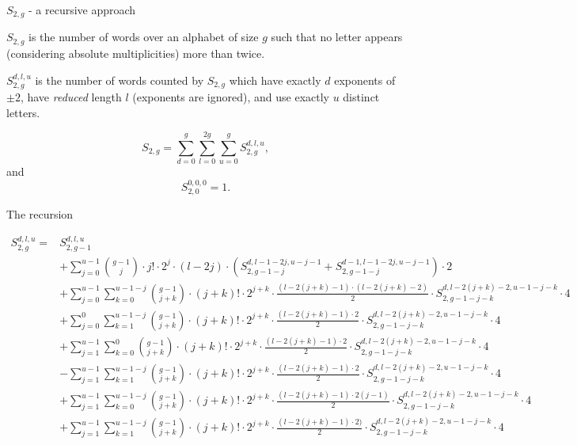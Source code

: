 \begin{frame}{$S_{2,g}$ - a recursive approach}

  \begin{definition}
    $S_{2,g}$ is the number of words over an alphabet of size $g$ such
    that no letter appears (considering absolute multiplicities) more
    than twice.
  \end{definition}

  \pause

  \begin{definition}
    $S_{2,g}^{d,l,u}$ is the number of words counted by $S_{2,g}$ which
    have exactly $d$ exponents of $\pm 2$, have \emph{reduced} length
    $l$ (exponents are ignored), and use exactly $u$ distinct letters.
  \end{definition}

  \pause

  \[S_{2,g} = \sum_{d=0}^{g} \sum_{l=0}^{2g} \sum_{u=0}^{g}
    S_{2,g}^{d,l,u}, \]
  and
  \[ S_{2,0}^{0,0,0} = 1. \]


\end{frame}

\begin{frame}{The recursion}

  {\tiny
    \begin{align*}
      S_{2,g}^{d,l,u} =& S_{2,g-1}^{d,l,u} \\
                       &+\sum_{j=0}^{u-1} {g-1 \choose j} \cdot j! \cdot 2^j \cdot (l - 2j) \cdot \left( S_{2,g-1-j}^{d, l-1-2j, u-j-1} + S_{2,g-1-j}^{d-1,l-1-2j,u-j-1} \right) \cdot 2 \\
                       &+  \sum_{j=0}^{u-1} \sum_{k=0}^{u-1-j} { g-1 \choose j + k} \cdot (j + k)! \cdot 2^{j + k} \cdot \frac{(l - 2(j + k) - 1) \cdot (l - 2 (j + k) - 2)}{2} \cdot S_{2,g-1-j-k}^{d,l-2(j+k) - 2,u-1-j-k} \cdot 4 \\
                       &+ \sum_{j=0}^{0} \sum_{k=1}^{u-1-j} { g-1 \choose j + k} \cdot (j + k)! \cdot 2^{j + k} \cdot \frac{(l - 2(j + k) - 1) \cdot 2}{2} \cdot S_{2,g-1-j-k}^{d,l-2(j+k) - 2,u-1-j-k} \cdot 4 \\
                       &+ \sum_{j=1}^{u-1} \sum_{k=0}^{0} { g-1 \choose j + k} \cdot (j + k)! \cdot 2^{j + k} \cdot \frac{(l - 2(j + k) - 1) \cdot 2}{2} \cdot S_{2,g-1-j-k}^{d,l-2(j+k) - 2,u-1-j-k} \cdot 4 \\
                       &- \sum_{j=1}^{u-1} \sum_{k=1}^{u-1-j} { g-1 \choose j + k} \cdot (j + k)! \cdot 2^{j + k} \cdot \frac{(l - 2(j + k) - 1) \cdot 2}{2} \cdot S_{2,g-1-j-k}^{d,l-2(j+k) - 2,u-1-j-k} \cdot 4 \\
                       &+ \sum_{j=1}^{u-1} \sum_{k=0}^{u-1-j} { g-1 \choose j + k} \cdot (j + k)! \cdot 2^{j + k} \cdot \frac{(l - 2(j + k) - 1) \cdot 2(j-1)}{2} \cdot S_{2,g-1-j-k}^{d,l-2(j+k) - 2,u-1-j-k} \cdot 4\\
                       &+ \sum_{j=1}^{u-1} \sum_{k=1}^{u-1-j} { g-1 \choose j + k} \cdot (j + k)! \cdot 2^{j + k} \cdot \frac{(l - 2(j + k) - 1) \cdot 2)}{2} \cdot S_{2,g-1-j-k}^{d,l-2(j+k) - 2,u-1-j-k} \cdot 4\\
    \end{align*}
  }

\end{frame}

